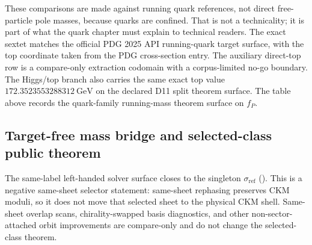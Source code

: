 \documentclass[11pt]{article}
\newcommand{\ophid}[1]{\path{#1}}
\begin{document}
These comparisons are made against running quark references, not direct free-particle pole
masses, because quarks are confined. That is not a technicality; it is part of what the quark
chapter must explain to technical readers. The exact sextet matches the official PDG 2025 API
running-quark target surface, with the top coordinate taken from the PDG cross-section entry. The
auxiliary direct-top row is a compare-only extraction codomain with a corpus-limited no-go boundary. The Higgs/top branch also carries the same exact
top value \(172.3523553288312~\mathrm{GeV}\) on the declared D11 split theorem surface. The table above
records the quark-family running-mass theorem surface on \(f_P\).

\subsection{Target-free mass bridge and selected-class public theorem}\label{quark-family-strongest-overlap-branch-primitives}

The same-label left-handed solver surface closes to the singleton
\(\sigma_{\mathrm{ref}}\) (\ophid{sigma_ref}). This is a negative same-sheet selector statement:
same-sheet rephasing preserves CKM moduli, so it does not move that selected sheet to the
physical CKM shell. Same-sheet overlap scans, chirality-swapped basis diagnostics, and other
non-sector-attached orbit improvements are compare-only and do not change the selected-class
theorem.
\end{document}

